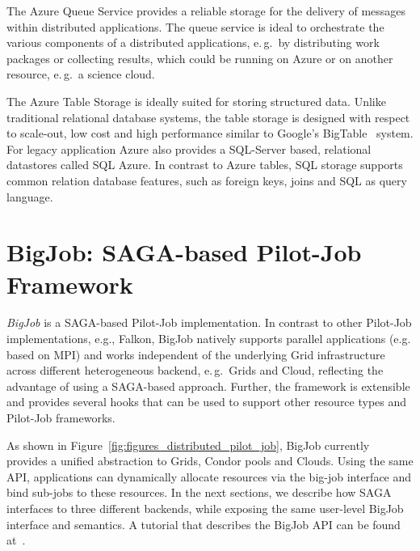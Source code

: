 \documentclass[conference,final]{IEEEtran}
\newcommand{\up}{\vspace*{-1em}}
\newcommand{\alnote}[1]{ {\textcolor{blue} { ***AL: #1 }}}
\newcommand{\jhanote}[1]{ {\textcolor{red} { ***SJ: #1 }}}
\newcommand{\alnote}[1]{}
\newcommand{\jhanote}[1]{}
\begin{document}
The Azure Queue Service provides a reliable storage for the delivery
of messages within distributed applications.  The queue service is
ideal to orchestrate the various components of a distributed
applications, e.\,g.\ by distributing work packages or collecting
results, which could be running on Azure or on another resource,
e.\,g.\ a science cloud.

The Azure Table Storage is ideally suited for storing structured
data. Unlike traditional relational database systems, the table
storage is designed with respect to scale-out, low cost and high
performance similar to Google's BigTable~\cite{bigtable2006}
system. For legacy application Azure also provides a SQL-Server based,
relational datastores called SQL Azure. In contrast to Azure tables,
SQL storage supports common relation database features, such as
foreign keys, joins and SQL as query language.


\section{BigJob: SAGA-based Pilot-Job Framework}

\emph{BigJob} is a SAGA-based Pilot-Job implementation. In contrast to
other Pilot-Job implementations, e.g., Falkon, BigJob natively
supports parallel applications (e.g. based on MPI) and works
independent of the underlying Grid infrastructure across different
heterogeneous backend, e.\,g.\ Grids and Cloud, reflecting the
advantage of using a SAGA-based approach. Further, the framework is
extensible and provides several hooks that can be used to support
other resource types and Pilot-Job frameworks.

As shown in Figure~\ref{fig:figures_distributed_pilot_job}, BigJob currently
provides a unified abstraction to Grids, Condor pools and
Clouds. Using the same API, applications can dynamically allocate
resources via the big-job interface and bind sub-jobs to these
resources. In the next sections, we describe how SAGA interfaces to
three different backends, while exposing the same user-level BigJob interface
and semantics. A tutorial that describes the BigJob API can be found 
at~\cite{bigjob_cloud_tutorial}.
\end{document}
